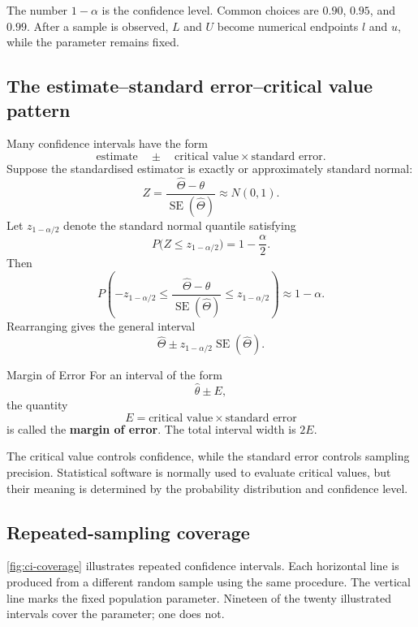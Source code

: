 The number $1-\alpha$ is the confidence level. Common choices are $0.90$, $0.95$, and $0.99$. After a sample is observed, $L$ and $U$ become numerical endpoints $l$ and $u$, while the parameter remains fixed.

\subsection{The estimate--standard error--critical value pattern}

Many confidence intervals have the form
\[
    \text{estimate}
    \quad\pm\quad
    \text{critical value}\times\text{standard error}.
\]
Suppose the standardised estimator is exactly or approximately standard normal:
\[
    Z=\frac{\widehat\Theta-\theta}
            {\operatorname{SE}(\widehat\Theta)}
      \approx N(0,1).
\]
Let $z_{1-\alpha/2}$ denote the standard normal quantile satisfying
\[
    P\bigl(Z\leq z_{1-\alpha/2}\bigr)=1-\frac{\alpha}{2}.
\]
Then
\[
    P\left(
      -z_{1-\alpha/2}
      \leq
      \frac{\widehat\Theta-\theta}
           {\operatorname{SE}(\widehat\Theta)}
      \leq
      z_{1-\alpha/2}
    \right)
    \approx1-\alpha.
\]
Rearranging gives the general interval
\[
    \widehat\Theta
      \pm
      z_{1-\alpha/2}\operatorname{SE}(\widehat\Theta).
\]

\begin{definition}{Margin of Error}
For an interval of the form
\[
    \widehat\theta\pm E,
\]
the quantity
\[
    E=\text{critical value}\times\text{standard error}
\]
is called the \textbf{margin of error}. The total interval width is $2E$.
\end{definition}

The critical value controls confidence, while the standard error controls sampling precision. Statistical software is normally used to evaluate critical values, but their meaning is determined by the probability distribution and confidence level.

\subsection{Repeated-sampling coverage}

\autoref{fig:ci-coverage} illustrates repeated confidence intervals. Each horizontal line is produced from a different random sample using the same procedure. The vertical line marks the fixed population parameter. Nineteen of the twenty illustrated intervals cover the parameter; one does not.

